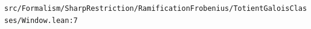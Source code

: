 \nolinkurl{src/Formalism/SharpRestriction/RamificationFrobenius/TotientGaloisClasses/Window.lean:7}%
